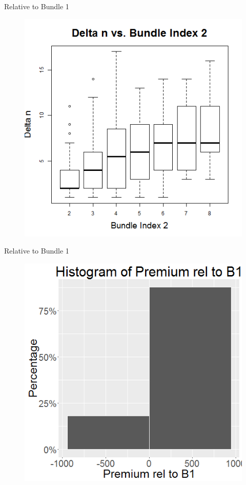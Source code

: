 \documentclass[xcolor=dvipsnames,12pt]{beamer}
\theoremstyle{definition}
\begin{document}
\begin{frame}{Relative to Bundle 1}
\begin{figure}

\graphicspath{ {../../1_relative_to_bundle_1/} }
\includegraphics[scale=0.43]{2_boxplot_delta_n_bundle_index2_rel_to_bundle_1}
\end{figure}
\end{frame}



\begin{frame}{Relative to Bundle 1}
\begin{figure}

\graphicspath{ {../../1_relative_to_bundle_1/} }
\includegraphics[scale=0.43]{3_histogram_of_prem_rel_to_bundle_1_2_col.png}
\end{figure}
\end{frame}
\end{document}

